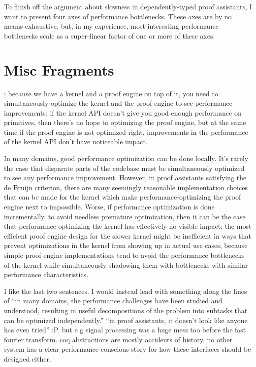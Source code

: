 
To finish off the argument about slowness in dependently-typed proof assistants, I want to present four axes of performance bottlenecks.
These axes are by no means exhaustive, but, in my experience, most interesting performance bottlenecks scale as a super-linear factor of one or more of these axes.

\section*{Misc Fragments}
:  because we have a kernel and a proof engine on top of it, you need to simultaneously optimize the kernel and the proof engine to see performance improvements; if the kernel API doesn't give you good enough performance on primitives, then there's no hope to optimizing the proof engine, but at the same time if the proof engine is not optimized right, improvements in the performance of the kernel API don't have noticeable impact.

In many domains, good performance optimization can be done locally.
It's rarely the case that disparate parts of the codebase must be simultaneously optimized to see any performance improvement.
However, in proof assistants satisfying the de Bruijn criterion, there are many seemingly reasonable implementation choices that can be made for the kernel which make performance-optimizing the proof engine next to impossible.
Worse, if performance optimization is done incrementally, to avoid needless premature optimization, then it can be the case that performance-optimizing the kernel has effectively no visible impact; the most efficient proof engine design for the slower kernel might be inefficient in ways that prevent optimizations in the kernel from showing up in actual use cases, because simple proof engine implementations tend to avoid the performance bottlenecks of the kernel while simultaneously shadowing them with bottlenecks with similar performance characteristics.

I like the last two sentences.
I would instead lead with something along the lines of ``in many domains, the performance challenges have been studied and understood, resulting in useful decompositions of the problem into subtasks that can be optimized independently.''
``in proof assistants, it doesn't look like anyone has even tried'' :P.
but e g signal processing was a huge mess too before the fast fourier transform.
coq abstractions are mostly accidents of history.
no other system has a clear performance-conscious story for how these interfaces should be designed either.

